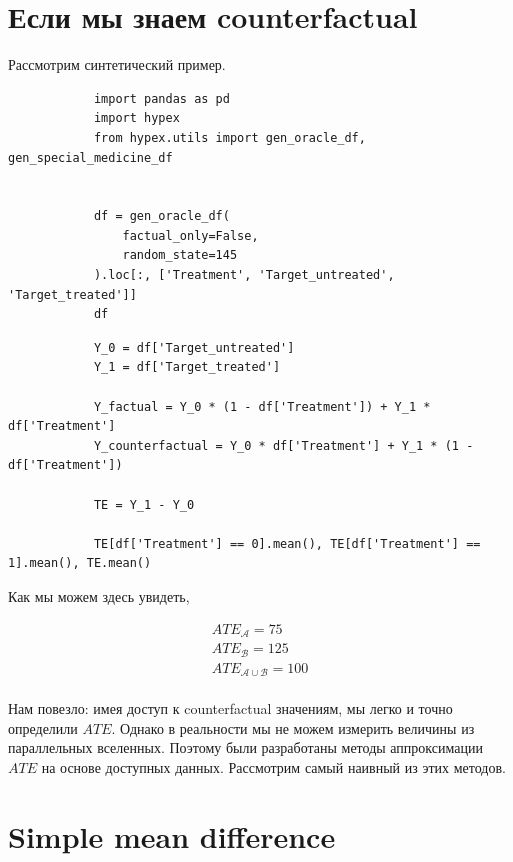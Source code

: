     \section*{Если мы знаем counterfactual}

        Рассмотрим синтетический пример.

        \begin{verbatim}
            import pandas as pd
            import hypex
            from hypex.utils import gen_oracle_df, gen_special_medicine_df


            df = gen_oracle_df(
                factual_only=False,
                random_state=145
            ).loc[:, ['Treatment', 'Target_untreated', 'Target_treated']]
            df
        \end{verbatim}


        


        \begin{verbatim}
            Y_0 = df['Target_untreated']
            Y_1 = df['Target_treated']

            Y_factual = Y_0 * (1 - df['Treatment']) + Y_1 * df['Treatment']
            Y_counterfactual = Y_0 * df['Treatment'] + Y_1 * (1 - df['Treatment'])

            TE = Y_1 - Y_0

            TE[df['Treatment'] == 0].mean(), TE[df['Treatment'] == 1].mean(), TE.mean()
        \end{verbatim}

        Как мы можем здесь увидеть,

        \begin{gather*}
            ATE_{\mathcal{A}} = 75\\
            ATE_{\mathcal{B}} = 125\\
            ATE_{\mathcal{A} \cup \mathcal{B}} = 100\\
        \end{gather*}

        Нам повезло: имея доступ к counterfactual значениям, мы легко и точно определили $ATE$.
        Однако в реальности мы не можем измерить величины из параллельных вселенных.
        Поэтому были разработаны методы аппроксимации $ATE$ на основе доступных данных.
        Рассмотрим самый наивный из этих методов.

    \section*{Simple mean difference}

